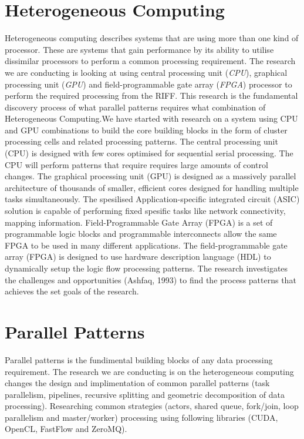 \documentclass{acm_proc_article-sp}
\begin{document}
\section{Heterogeneous Computing}
Heterogeneous computing describes systems that are using more than one kind of processor. These are systems that gain performance by its ability to utilise dissimilar processors to perform a common processing requirement. The research we are conducting is looking at using central processing unit (\textit{CPU}), graphical processing unit (\textit{GPU}) and field-programmable gate array (\textit{FPGA}) processor to perform the required processing from the RIFF. This research is the fundamental discovery process of what parallel patterns requires what combination of Heterogeneous Computing.We have started with research on a system using CPU and GPU combinations to build the core building blocks in the form of cluster processing cells and related processing patterns. The central processing unit (CPU) is designed with few cores optimised for sequential serial processing. The CPU will perform patterns that require requires large amounts of control changes. The graphical processing unit (GPU) is designed as a massively parallel architecture of thousands of smaller, efficient cores designed for handling multiple tasks simultaneously. The spesilised Application-specific integrated circuit (ASIC) solution is capable of performing fixed spesific tasks like network connectivity, mapping information. Field-Programmable Gate Array (FPGA) is a set of programmable logic blocks and programmable interconnects allow the same FPGA to be used in many different applications. The field-programmable gate array (FPGA) is designed to use hardware description language (HDL) to dynamically setup the logic flow processing patterns. The research investigates the challenges and opportunities (Ashfaq, 1993) to find the process patterns that achieves the set goals of the research.  
\section{Parallel Patterns}
Parallel patterns is the fundimental building blocks of any data processing requirement. The research we are conducting is on the heterogeneous computing changes the design and implimentation of common parallel patterns (task parallelism, pipelines, recursive splitting and geometric decomposition of data processing). Researching common strategies (actors, shared queue, fork/join, loop parallelism and master/worker) processing using following libraries (CUDA, OpenCL, FastFlow and ZeroMQ).
\end{document}
